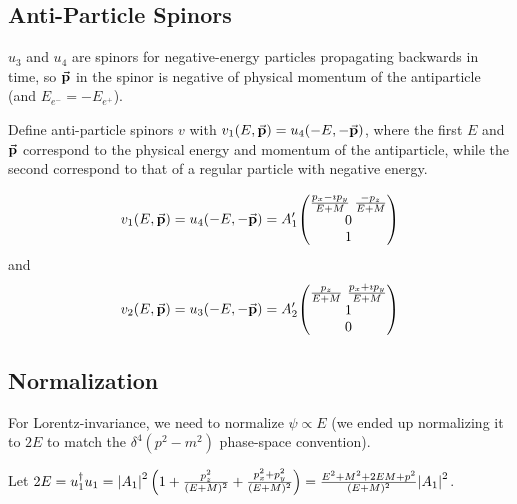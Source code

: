 \documentclass[a4paper,twoside,master.tex]{subfiles}
\begin{document}
\subsection{Anti-Particle Spinors}\label{sub:anti-particle_spinors}

$ u_3 $ and $ u_4 $ are spinors for negative-energy particles propagating backwards in time, so $ \va{p} $ in the spinor is negative of physical momentum of the antiparticle (and $ E_{e^-} = - E_{e^+} $).

Define anti-particle spinors $ v $ with $ v_1(E, \va{p}) = u_4(-E, - \va{p}) $, where the first $ E $ and $ \va{p} $ correspond to the physical energy and momentum of the antiparticle, while the second correspond to that of a regular particle with negative energy.

\begin{equation}
    v_1(E, \va{p}) = u_4(-E, - \va{p}) = A'_1 \mqty(\frac{p_x - \imath p_y}{E+M} \ \frac{- p_z}{E+M} \\ 0 \\ 1)
\end{equation}
and
\begin{equation}
    v_2(E, \va{p}) = u_3(-E, - \va{p}) = A'_2 \mqty(\frac{p_z}{E+M} \ \frac{p_x + \imath p_y}{E+M} \\ 1 \\ 0)
\end{equation}

\subsection{Normalization}\label{sub:normalization}

For Lorentz-invariance, we need to normalize $ \psi \propto E $ (we ended up normalizing it to $ 2E $ to match the $ \delta^4(p^2-m^2) $ phase-space convention).

Let $ 2E = u_1^\dagger u_1 = \abs{A_1}^2 \left( 1 + \frac{p_z^2}{(E + M)^2} + \frac{p_x^2 + p_y^2}{(E + M)^2} \right) = \frac{E^2 + M^2 + 2 E M + p^2}{(E + M)^2} \abs{A_1}^2 $.
\end{document}
